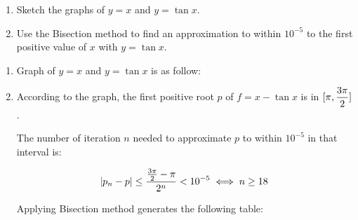 \documentclass[../../../../Assignments.tex]{subfiles}
\begin{document}
\begin{exercise}
    \begin{enumerate}[label = (\alph*)]
        \item Sketch the graphs of \(y = x\) and \(y = \tan{x}\).
        \item Use the Bisection method to find an approximation to within
            \(10^{-5}\) to the first positive value of \(x\) with \(y =
            \tan{x}\).
    \end{enumerate}
\end{exercise}

\begin{solution}
    \begin{enumerate}[label = (\alph*)]
        \item Graph of \(y = x\) and \(y = \tan{x}\) is as follow:

            \begin{center}
                
            \end{center}

        \item According to the graph, the first positive root \(p\) of \(f = x -
            \tan{x}\) is in \(\interval{\pi}{\dfrac{3 \pi}{2}}\).

            The number of iteration \(n\) needed to approximate \(p\) to within
            \(10^{-5}\) in that interval is:

            \[\abs{p_n - p} \leq \frac{\frac{3 \pi}{2} - \pi}{2^n} < 10^{-5} \iff n \geq 18\]

            Applying Bisection method generates the following table:


\end{enumerate}
\end{solution}
\end{document}
